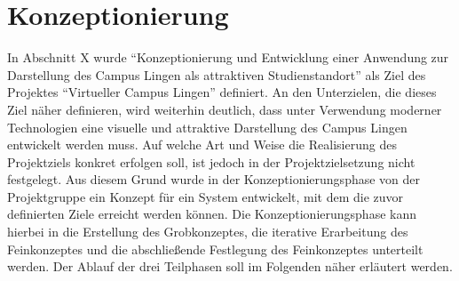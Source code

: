 \section{Konzeptionierung}
\label{sec:Konzeptionierung}

In Abschnitt X wurde "`Konzeptionierung und Entwicklung
einer Anwendung zur Darstellung des Campus Lingen als attraktiven
Studienstandort"' als Ziel des Projektes "`Virtueller Campus Lingen"'
definiert. An den Unterzielen, die dieses Ziel näher definieren, wird weiterhin
deutlich, dass unter Verwendung moderner Technologien eine visuelle und
attraktive Darstellung des Campus Lingen entwickelt werden muss. Auf welche Art
und Weise die Realisierung des Projektziels konkret erfolgen soll, ist jedoch in
der Projektzielsetzung nicht festgelegt. Aus diesem Grund wurde in der
Konzeptionierungsphase von der Projektgruppe ein Konzept für ein System
entwickelt, mit dem die zuvor definierten Ziele erreicht werden können. Die
Konzeptionierungsphase kann hierbei in die Erstellung des Grobkonzeptes, die
iterative Erarbeitung des Feinkonzeptes und die abschließende Festlegung des
Feinkonzeptes unterteilt werden. Der Ablauf der drei Teilphasen soll im
Folgenden näher erläutert werden.





